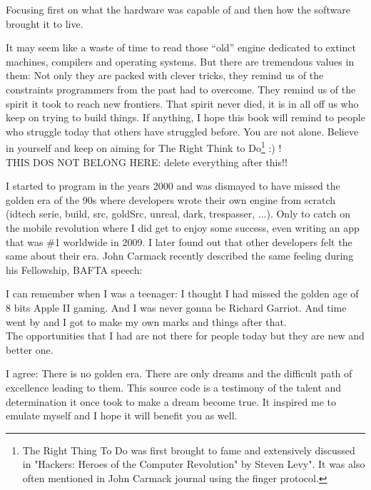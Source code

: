 \documentclass[book.tex]{subfiles}
\begin{document}
Focusing first on what the hardware was capable of and then how the software brought it to live.

\bigskip

It may seem like a waste of time to read those ``old'' engine dedicated to extinct machines, compilers and operating systems. But there are tremendous values in them: Not only they are packed with clever tricks, they remind us of the constraints programmers from the past had to overcome. They remind us of the spirit it took to reach new frontiers. That spirit never died, it is in all off us who keep on trying to build things. If anything, I hope this book will remind to people who struggle today that others have struggled before. You are not alone. Believe in yourself and keep on aiming for The Right Think to Do\footnote{The Right Thing To Do was first brought to fame and extensively discussed in "Hackers: Heroes of the Computer Revolution" by Steven Levy". It was also often mentioned in John Carmack journal using the finger protocol.} :) !\\

\bigskip
THIS DOS NOT BELONG HERE: delete everything after this!!\\
\bigskip

I started to program in the years 2000 and was dismayed to have missed the golden era of the 90s where developers wrote their own engine from scratch (idtech serie, build, src, goldSrc, unreal, dark, trespasser, ...). Only to catch on the mobile revolution where I did get to enjoy some success, even writing an app that was \#1 worldwide in 2009. I later found out that other developers felt the same about their era. John Carmack recently described the same feeling during his Fellowship, BAFTA speech:\\

 \begin{fancyquotes}
I can remember when I was a teenager: I thought I had missed the golden age of 8 bits Apple II gaming. And I was never gonna be Richard Garriot. And time went by and I got to make
    my own marks and things after that.\\
    
    The opportunities that I had are not there for people today but they are new and better one.
 \bigskip
 \end{fancyquotes}


    
\bigskip
    I agree: There is no golden era. There are only dreams and the difficult path of excellence leading to them. This source code is a testimony of the talent and determination it once took to make a dream become true. It inspired me to emulate myself and I hope it will benefit you as well.

\bigskip


  
\end{document}
